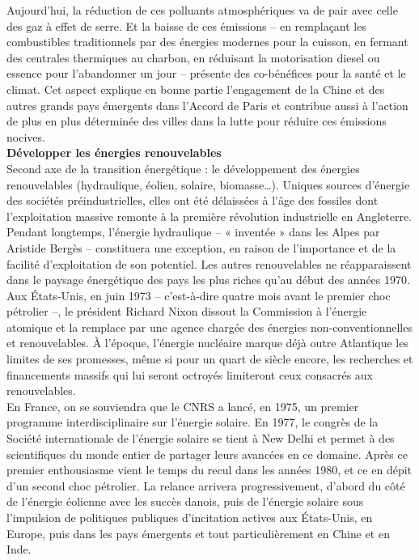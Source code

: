 \documentclass[8pt]{article}
\begin{document}
Aujourd’hui, la réduction de ces polluants atmosphériques va de pair avec celle des gaz à effet de serre. Et la baisse de ces émissions – en remplaçant les combustibles traditionnels par des énergies modernes pour la cuisson, en fermant des centrales thermiques au charbon, en réduisant la motorisation diesel ou essence pour l’abandonner un jour – présente des co-bénéfices pour la santé et le climat.
Cet aspect explique en bonne partie l’engagement de la Chine et des autres grands pays émergents dans l’Accord de Paris et contribue aussi à l’action de plus en plus déterminée des villes dans la lutte pour réduire ces émissions nocives.\\

\textbf{Développer les énergies renouvelables}\\


Second axe de la transition énergétique : le développement des énergies renouvelables (hydraulique, éolien, solaire, biomasse…).
Uniques sources d’énergie des sociétés préindustrielles, elles ont été délaissées à l’âge des fossiles dont l’exploitation massive remonte à la première révolution industrielle en Angleterre. Pendant longtemps, l’énergie hydraulique – « inventée » dans les Alpes par Aristide Bergès – constituera une exception, en raison de l’importance et de la facilité d’exploitation de son potentiel.
Les autres renouvelables ne réapparaissent dans le paysage énergétique des pays les plus riches qu’au début des années 1970. Aux États-Unis, en juin 1973 – c’est-à-dire quatre mois avant le premier choc pétrolier –, le président Richard Nixon dissout la Commission à l’énergie atomique et la remplace par une agence chargée des énergies non-conventionnelles et renouvelables. À l’époque, l’énergie nucléaire marque déjà outre Atlantique les limites de ses promesses, même si pour un quart de siècle encore, les recherches et financements massifs qui lui seront octroyés limiteront ceux consacrés aux renouvelables.\\


En France, on se souviendra que le CNRS a lancé, en 1975, un premier programme interdisciplinaire sur l’énergie solaire. En 1977, le congrès de la Société internationale de l’énergie solaire se tient à New Delhi et permet à des scientifiques du monde entier de partager leurs avancées en ce domaine.
Après ce premier enthousiasme vient le temps du recul dans les années 1980, et ce en dépit d’un second choc pétrolier. La relance arrivera progressivement, d’abord du côté de l’énergie éolienne avec les succès danois, puis de l’énergie solaire sous l’impulsion de politiques publiques d’incitation actives aux États-Unis, en Europe, puis dans les pays émergents et tout particulièrement en Chine et en Inde.\\
\end{document}
